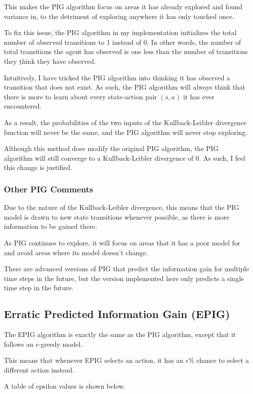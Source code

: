 \documentclass[12pt]{thesis}
\begin{document}
This makes the PIG algorithm focus on areas it has already explored and found variance in, to the detriment of exploring anywhere it has only touched once.

To fix this issue, the PIG algorithm in my implementation initializes the total number of observed transitions to 1 instead of 0. In other words, the number of total transitions the agent has observed is one less than the number of transitions they \b{think} they have observed.

Intuitively, I have tricked the PIG algorithm into thinking it has observed a transition that does not exist. As such, the PIG algorithm will always think that there is more to learn about every state-action pair $(s,a)$ it has ever encountered.

As a result, the probabilities of the two inputs of the Kullback-Leibler divergence function will never be the same, and the PIG algorithm will never stop exploring.

Although this method does modify the original PIG algorithm, the PIG algorithm will still converge to a Kullback-Leibler divergence of 0. As such, I feel this change is justified.

\subsubsection{Other PIG Comments} 
Due to the nature of the Kullback-Leibler divergence, this means that the PIG model is drawn to new state transitions whenever possible, as there is more information to be gained there.

As PIG continues to explore, it will focus on areas that it has a poor model for and avoid areas where its model doesn't change.

There are advanced versions of PIG that predict the information gain for multiple time steps in the future, but the version implemented here only predicts a single time step in the future. 
\subsection{Erratic Predicted Information Gain (EPIG)}
The EPIG algorithm is exactly the same as the PIG algorithm, except that it follows an $\epsilon$-greedy model.

This means that whenever EPIG selects an action, it has an $\epsilon$\% chance to select a different action instead.

A table of epsilon values is shown below.
\end{document}

